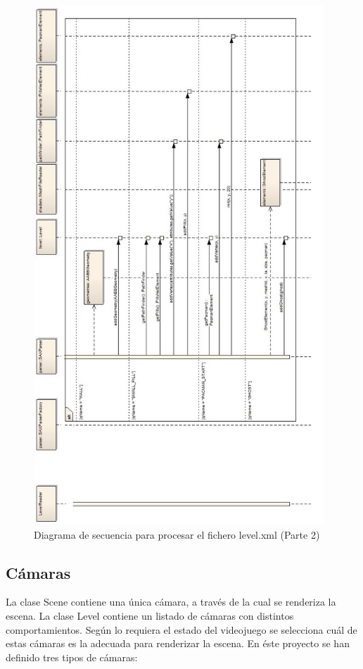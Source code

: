 \begin{figure}[h!]
\centering
\includegraphics[height=19.5cm]{img/uml/LevelReaderRead2.jpg}	
\caption{Diagrama de secuencia para procesar el fichero level.xml (Parte 2)}
\end{figure}


\newpage




\subsection{Cámaras}

La clase Scene contiene una única cámara, a través de la cual se renderiza la escena. La clase Level contiene un listado de cámaras con distintos comportamientos. Según lo requiera el estado del videojuego se selecciona cuál de estas cámaras es la adecuada para renderizar la escena. 
En éste proyecto se han definido tres tipos de cámaras:

